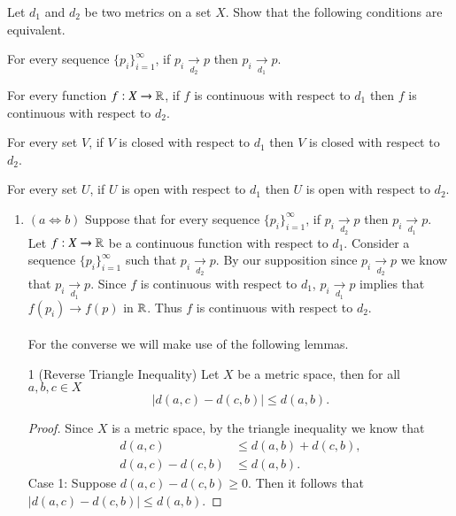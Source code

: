\documentclass[minion]{homework651}
\newcommand\converges[1]{\mathrel{\mathop{\longrightarrow}\limits_{#1}}}
\begin{document}
\begin{problems}
\problem Let $d_1$ and $d_2$ be two metrics on a set $X$. Show that the following conditions are equivalent. 
\begin{subproblems}
    \item For every sequence $\{ p_i\}_{i=1}^\infty$, if $p_i\converges{d_2} p$ 
    then $p_i\converges{d_1} p$.
    \item For every function $f:X\rightarrow \mathbb R$, if $f$ is continuous with 
    respect to $d_1$ then $f$ is continuous with respect to $d_2$.
    \item For every set $V$, if $V$ is closed with respect to $d_1$ then
    $V$ is closed with respect to $d_2$.
    \item For every set $U$, if $U$ is open with respect to $d_1$ then
    $U$ is open with respect to $d_2$.
    \end{subproblems}
\solution 

\begin{enumerate}
    \item $(a \Longleftrightarrow b)$ Suppose that for every sequence $\{ p_i\}_{i=1}^\infty$, if $p_i\converges{d_2} p$ 
    then $p_i\converges{d_1} p$. Let $f:X\rightarrow \mathbb R$ be a continuous function with 
    respect to $d_1$. Consider a sequence $\{p_i\}_{i=1}^\infty$ such that $p_i\converges{d_2} p$. 
    By our supposition since $p_i\converges{d_2} p$ we know that $p_i\converges{d_1} p$. Since $f$ is continuous with respect to $d_1$, $p_i\converges{d_1} p$ implies that $f(p_i) \to f(p)$ in $\mathbb R$.
    Thus $f$ is continuous with respect to $d_2$. \\\\



    For the converse we will make use of the following lemmas. 
    \begin{lemma}{1 (Reverse Triangle Inequality)}        
        Let $X$ be a metric space, then for all $a, b, c \in X$
        \begin{equation*}
            |d(a, c) - d(c, b)| \leq d(a, b).
        \end{equation*}
        \begin{proof}
            Since $X$ is a metric space, by the triangle inequality we know that
            \begin{align*}
                d(a, c) &\leq d(a, b) + d(c, b),\\
                d(a, c) - d(c, b) &\leq d(a, b).
            \end{align*}
            Case 1: Suppose $d(a, c) - d(c, b) \geq 0$. Then it follows that $|d(a, c) - d(c, b)| \leq d(a, b)$.



\end{proof}
\end{lemma}
\end{enumerate}
\end{problems}
\end{document}

